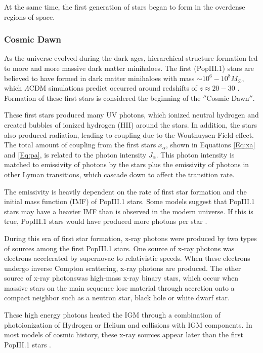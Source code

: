 At the same time, the first generation of stars began to form in the overdense regions of space. 

\subsubsection{Cosmic Dawn}

As the universe evolved during the dark ages, hierarchical structure formation led to more and more massive dark matter minihaloes. The first (PopIII.1) stars are believed to have formed in dark matter minihaloes with mass $\sim 10^6 - 10^8 M_{\odot}$, which $\Lambda$CDM simulations predict occurred around redshifts of $z \approx 20-30$ \cite{bromm_2013}. Formation of these first stars is considered the beginning of the $''$Cosmic Dawn$''$. 


These first stars produced many UV photons, which ionized neutral hydrogen and created bubbles of ionized hydrogen (HII) around the stars. In addition, the stars also produced \lya  radiation, leading to coupling due to the Wouthuysen-Field effect. The total amount of coupling from the first stars $x_\alpha$, shown in Equations \ref{Eq:xa} and \ref{Eq:pa}, is related to the \lya  photon intensity $J_\alpha$. This photon intensity is matched to emissivity of \lya  photons by the stars  plus the emissivity of photons in other Lyman transitions, which cascade down to affect the \lya  transition rate. 

The emissivity is heavily dependent on the rate of first star formation and the initial mass function (IMF) of PopIII.1 stars. Some models suggest that PopIII.1 stars may have a heavier IMF than is observed in the modern universe. If this is true, PopIII.1 stars would have produced more \lya  photons per star \cite{natarajan_2014}. 

During this era of first star formation, x-ray photons were produced by two types of sources among the first PopIII.1 stars. One source of x-ray photons was electrons accelerated by supernovae to relativistic speeds. When these electrons undergo inverse Compton scattering, x-ray photons are produced. The other source of x-ray photonswas high-mass x-ray binary stars, which occur when massive stars on the main sequence lose material through accretion onto a compact neighbor such as a neutron star, black hole or white dwarf star. 

These high energy photons heated the IGM through a combination of photoionization of Hydrogen or Helium and collisions with IGM components. In most models of cosmic history, these x-ray sources appear later than the first PopIII.1 stars \cite{furlanetto_2006}. 

